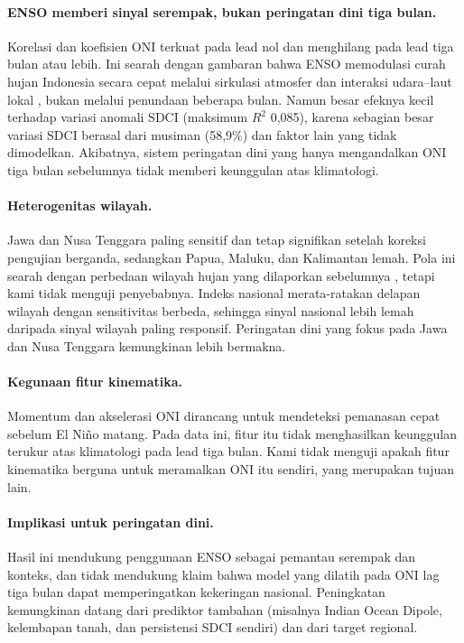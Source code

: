 \documentclass[11pt,twoside]{article}
\begin{document}
\paragraph{ENSO memberi sinyal serempak, bukan peringatan dini tiga bulan.} Korelasi dan koefisien ONI terkuat pada lead nol dan menghilang pada lead tiga bulan atau lebih. Ini searah dengan gambaran bahwa ENSO memodulasi curah hujan Indonesia secara cepat melalui sirkulasi atmosfer dan interaksi udara--laut lokal \cite{hendon2003indonesian,aldrian2003rainfall}, bukan melalui penundaan beberapa bulan. Namun besar efeknya kecil terhadap variasi anomali SDCI (maksimum $R^2$ 0,085), karena sebagian besar variasi SDCI berasal dari musiman (58,9\%) dan faktor lain yang tidak dimodelkan. Akibatnya, sistem peringatan dini yang hanya mengandalkan ONI tiga bulan sebelumnya tidak memberi keunggulan atas klimatologi.

\paragraph{Heterogenitas wilayah.} Jawa dan Nusa Tenggara paling sensitif dan tetap signifikan setelah koreksi pengujian berganda, sedangkan Papua, Maluku, dan Kalimantan lemah. Pola ini searah dengan perbedaan wilayah hujan yang dilaporkan sebelumnya \cite{aldrian2003rainfall,hamada2002rainy}, tetapi kami tidak menguji penyebabnya. Indeks nasional merata-ratakan delapan wilayah dengan sensitivitas berbeda, sehingga sinyal nasional lebih lemah daripada sinyal wilayah paling responsif. Peringatan dini yang fokus pada Jawa dan Nusa Tenggara kemungkinan lebih bermakna.

\paragraph{Kegunaan fitur kinematika.} Momentum dan akselerasi ONI dirancang untuk mendeteksi pemanasan cepat sebelum El Ni\~no matang. Pada data ini, fitur itu tidak menghasilkan keunggulan terukur atas klimatologi pada lead tiga bulan. Kami tidak menguji apakah fitur kinematika berguna untuk meramalkan ONI itu sendiri, yang merupakan tujuan lain.

\paragraph{Implikasi untuk peringatan dini.} Hasil ini mendukung penggunaan ENSO sebagai pemantau serempak dan konteks, dan tidak mendukung klaim bahwa model yang dilatih pada ONI lag tiga bulan dapat memperingatkan kekeringan nasional. Peningkatan kemungkinan datang dari prediktor tambahan (misalnya Indian Ocean Dipole, kelembapan tanah, dan persistensi SDCI sendiri) dan dari target regional.
\end{document}
